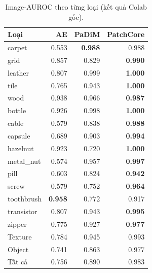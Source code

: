 \begin{table}[htbp]\centering
\caption{Image-AUROC theo từng loại (kết quả Colab gốc).}
\begin{tabular}{@{}lrrr@{}}\toprule Loại & AE & PaDiM & PatchCore \\ \midrule
carpet & 0.553 & \textbf{0.988} & 0.988 \\
grid & 0.857 & 0.829 & \textbf{0.990} \\
leather & 0.807 & 0.999 & \textbf{1.000} \\
tile & 0.765 & 0.943 & \textbf{1.000} \\
wood & 0.938 & 0.966 & \textbf{0.987} \\
bottle & 0.926 & 0.998 & \textbf{1.000} \\
cable & 0.579 & 0.838 & \textbf{0.988} \\
capsule & 0.689 & 0.903 & \textbf{0.994} \\
hazelnut & 0.923 & 0.720 & \textbf{1.000} \\
metal\_nut & 0.574 & 0.957 & \textbf{0.997} \\
pill & 0.603 & 0.824 & \textbf{0.942} \\
screw & 0.579 & 0.752 & \textbf{0.964} \\
toothbrush & \textbf{0.958} & 0.772 & 0.917 \\
transistor & 0.807 & 0.943 & \textbf{0.995} \\
zipper & 0.775 & 0.927 & \textbf{0.977} \\
\midrule Texture & 0.784 & 0.945 & 0.993 \\
Object & 0.741 & 0.863 & 0.977 \\
Tất cả & 0.756 & 0.890 & 0.983 \\
\bottomrule\end{tabular}\end{table}

